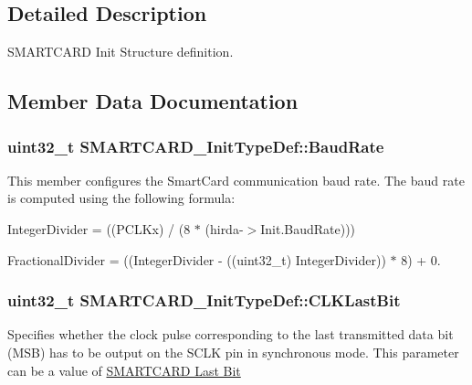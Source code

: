 \subsection{Detailed Description}
S\+M\+A\+R\+T\+C\+A\+RD Init Structure definition. 

\subsection{Member Data Documentation}
\subsubsection[{\texorpdfstring{Baud\+Rate}{BaudRate}}]{\setlength{\rightskip}{0pt plus 5cm}uint32\+\_\+t S\+M\+A\+R\+T\+C\+A\+R\+D\+\_\+\+Init\+Type\+Def\+::\+Baud\+Rate}\hypertarget{struct_s_m_a_r_t_c_a_r_d___init_type_def_ab7fd32cfbfc629344b4e4d5844e798cd}{}\label{struct_s_m_a_r_t_c_a_r_d___init_type_def_ab7fd32cfbfc629344b4e4d5844e798cd}
This member configures the Smart\+Card communication baud rate. The baud rate is computed using the following formula\+:
\begin{DoxyItemize}
\item Integer\+Divider = ((P\+C\+L\+Kx) / (8 $\ast$ (hirda-\/$>$Init.\+Baud\+Rate)))
\item Fractional\+Divider = ((Integer\+Divider -\/ ((uint32\+\_\+t) Integer\+Divider)) $\ast$ 8) + 0. 
\end{DoxyItemize}
\subsubsection[{\texorpdfstring{C\+L\+K\+Last\+Bit}{CLKLastBit}}]{\setlength{\rightskip}{0pt plus 5cm}uint32\+\_\+t S\+M\+A\+R\+T\+C\+A\+R\+D\+\_\+\+Init\+Type\+Def\+::\+C\+L\+K\+Last\+Bit}\hypertarget{struct_s_m_a_r_t_c_a_r_d___init_type_def_a484c956dcdfc4e604758698b3541c128}{}\label{struct_s_m_a_r_t_c_a_r_d___init_type_def_a484c956dcdfc4e604758698b3541c128}
Specifies whether the clock pulse corresponding to the last transmitted data bit (M\+SB) has to be output on the S\+C\+LK pin in synchronous mode. This parameter can be a value of \hyperlink{group___s_m_a_r_t_c_a_r_d___last___bit}{S\+M\+A\+R\+T\+C\+A\+RD Last Bit} 
